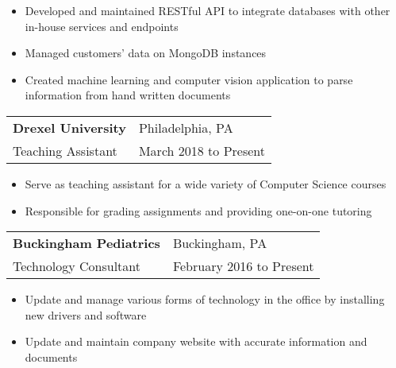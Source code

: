 \documentclass[9pt,]{article}
\let\oldparagraph\paragraph
\renewcommand{\paragraph}[1]{\oldparagraph{#1}\mbox{}}
\begin{document}
\begin{itemize}
	\setlength\itemsep{-0.75em}
    \item Developed and maintained RESTful API to integrate databases with other in-house services and endpoints
    \item Managed customers' data on MongoDB instances
    \item Created machine learning and computer vision application to parse information from hand written documents
\end{itemize}

\begin{tabularx}{\textwidth}{l X}
	\textbf{Drexel University} & \hfill Philadelphia, PA\\
	Teaching Assistant          & \hfill March 2018 to Present
\end{tabularx}

\begin{itemize}
	\setlength\itemsep{-1.75em}
	\item Serve as teaching assistant for a wide variety of Computer Science courses\\
	\item Responsible for grading assignments and providing one-on-one tutoring\\
\end{itemize}
\vspace{-2mm}

\begin{tabularx}{\textwidth}{l X}
    \textbf{Buckingham Pediatrics} & \hfill Buckingham, PA\\
    Technology Consultant          & \hfill February 2016 to Present
\end{tabularx}

\begin{itemize}
	\setlength\itemsep{-0.75em}
    \item Update and manage various forms of technology in the office by installing new drivers and software
    \item Update and maintain company website with accurate information and documents
\end{itemize}

\vspace{-3mm}

\end{document}
